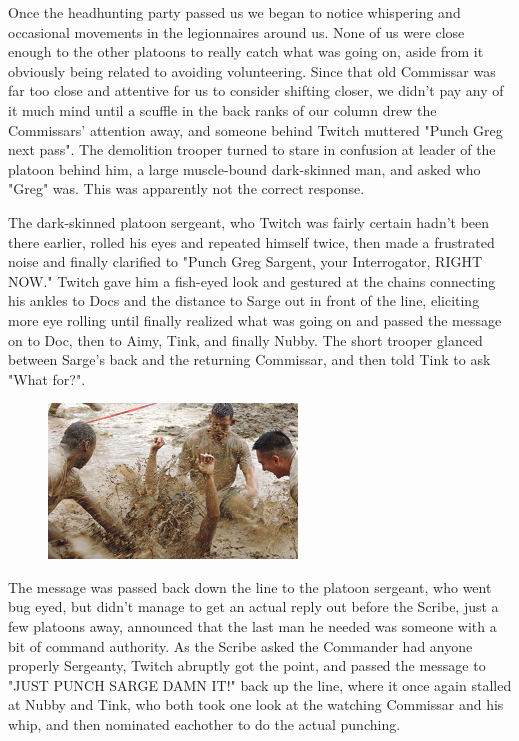Once the headhunting party passed us we began to notice whispering and occasional movements in the legionnaires around us. 
None of us were close enough to the other platoons to really catch what was going on, aside from it obviously being related to avoiding volunteering. 
Since that old Commissar was far too close and attentive for us to consider shifting closer, we didn't pay any of it much mind until a scuffle in the back ranks of our column drew the Commissars' attention away, and someone behind Twitch muttered "Punch Greg next pass". 
The demolition trooper turned to stare in confusion at leader of the platoon behind him, a large muscle-bound dark-skinned man, and asked who "Greg" was. 
This was apparently not the correct response.

The dark-skinned platoon sergeant, who Twitch was fairly certain hadn't been there earlier, rolled his eyes and repeated himself twice, then made a frustrated noise and finally clarified to "Punch Greg Sargent, your Interrogator, RIGHT NOW." Twitch gave him a fish-eyed look and gestured at the chains connecting his ankles to Docs and the distance to Sarge out in front of the line, eliciting more eye rolling until finally realized what was going on and passed the message on to Doc, then to Aimy, Tink, and finally Nubby. 
The short trooper glanced between Sarge's back and the returning Commissar, and then told Tink to ask "What for?".

\begin{figure}
	\begin{center}
		\includegraphics[width=\figwidth]{pics/21/9.png}
	\end{center}
\end{figure}
The message was passed back down the line to the platoon sergeant, who went bug eyed, but didn't manage to get an actual reply out before the Scribe, just a few platoons away, announced that the last man he needed was someone with a bit of command authority. 
As the Scribe asked the Commander had anyone properly Sergeanty, Twitch abruptly got the point, and passed the message to "JUST PUNCH SARGE DAMN IT!" back up the line, where it once again stalled at Nubby and Tink, who both took one look at the watching Commissar and his whip, and then nominated eachother to do the actual punching. 


